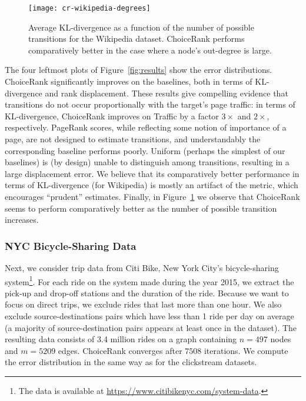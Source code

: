 \begin{figure}[t]
  \centering
  \texttt{[image: cr-wikipedia-degrees]}
  \caption{
Average KL-divergence as a function of the number of possible transitions for the Wikipedia dataset.
ChoiceRank performs comparatively better in the case where a node's out-degree is large.
}
  \label{fig:wpdegs}
\end{figure}

The four leftmost plots of Figure~\ref{fig:results} show the error distributions.
ChoiceRank significantly improves on the baselines, both in terms of KL-divergence and rank displacement.
These results give compelling evidence that transitions do not occur proportionally with the target's page traffic: in terms of KL-divergence, ChoiceRank improves on Traffic by a factor $3\times$ and $2\times$, respectively.
PageRank scores, while reflecting some notion of importance of a page, are not designed to estimate transitions, and understandably the corresponding baseline performs poorly.
Uniform (perhaps the simplest of our baselines) is (by design) unable to distinguish among transitions, resulting in a large displacement error.
We believe that its comparatively better performance in terms of KL-divergence (for Wikipedia) is mostly an artifact of the metric, which encourages ``prudent'' estimates.
Finally, in Figure~\ref{fig:wpdegs} we observe that ChoiceRank seems to perform comparatively better as the number of possible transition increases.


\subsubsection{NYC Bicycle-Sharing Data}

Next, we consider trip data from Citi Bike, New York City's bicycle-sharing system\footnote{The data is available at \url{https://www.citibikenyc.com/system-data}.}.
For each ride on the system made during the year 2015, we extract the pick-up and drop-off stations and the duration of the ride.
Because we want to focus on direct trips, we exclude rides that last more than one hour.
We also exclude source-destinations pairs which have less than 1 ride per day on average (a majority of source-destination pairs appears at least once in the dataset).
The resulting data consists of \num{3.4} million rides on a graph containing $n = \num{497}$ nodes and $m = \num{5209}$ edges.
ChoiceRank converges after $\num{7508}$ iterations.
We compute the error distribution in the same way as for the clickstream datasets.

